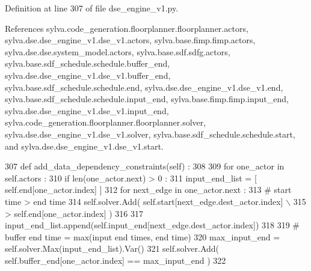 Definition at line 307 of file dse\+\_\+engine\+\_\+v1.\+py.



References sylva.\+code\+\_\+generation.\+floorplanner.\+floorplanner.\+actors, sylva.\+dse.\+dse\+\_\+engine\+\_\+v1.\+dse\+\_\+v1.\+actors, sylva.\+base.\+fimp.\+fimp.\+actors, sylva.\+dse.\+dse.\+system\+\_\+model.\+actors, sylva.\+base.\+sdf.\+sdfg.\+actors, sylva.\+base.\+sdf\+\_\+schedule.\+schedule.\+buffer\+\_\+end, sylva.\+dse.\+dse\+\_\+engine\+\_\+v1.\+dse\+\_\+v1.\+buffer\+\_\+end, sylva.\+base.\+sdf\+\_\+schedule.\+schedule.\+end, sylva.\+dse.\+dse\+\_\+engine\+\_\+v1.\+dse\+\_\+v1.\+end, sylva.\+base.\+sdf\+\_\+schedule.\+schedule.\+input\+\_\+end, sylva.\+base.\+fimp.\+fimp.\+input\+\_\+end, sylva.\+dse.\+dse\+\_\+engine\+\_\+v1.\+dse\+\_\+v1.\+input\+\_\+end, sylva.\+code\+\_\+generation.\+floorplanner.\+floorplanner.\+solver, sylva.\+dse.\+dse\+\_\+engine\+\_\+v1.\+dse\+\_\+v1.\+solver, sylva.\+base.\+sdf\+\_\+schedule.\+schedule.\+start, and sylva.\+dse.\+dse\+\_\+engine\+\_\+v1.\+dse\+\_\+v1.\+start.


\begin{DoxyCode}
307   \textcolor{keyword}{def }add\_data\_dependency\_constraints(self) :
308 
309     \textcolor{keywordflow}{for} one\_actor \textcolor{keywordflow}{in} self.actors :
310       \textcolor{keywordflow}{if} len(one\_actor.next) > 0 :
311         input\_end\_list = [ self.end[one\_actor.index] ]
312         \textcolor{keywordflow}{for} next\_edge \textcolor{keywordflow}{in} one\_actor.next :
313           \textcolor{comment}{# start time > end time}
314           self.solver.Add( self.start[next\_edge.dest\_actor.index] \(\backslash\)
315                          > self.end[one\_actor.index] )
316 
317           input\_end\_list.append(self.input\_end[next\_edge.dest\_actor.index])
318 
319         \textcolor{comment}{# buffer end time = max(input end times, end time)}
320         max\_input\_end = self.solver.Max(input\_end\_list).Var()
321         self.solver.Add( self.buffer\_end[one\_actor.index] == max\_input\_end )
322 
\end{DoxyCode}
\mbox{\label{classsylva_1_1dse_1_1dse__engine__v1_1_1dse__v1_a240db3c706f81867165183e826760d5f}} 
